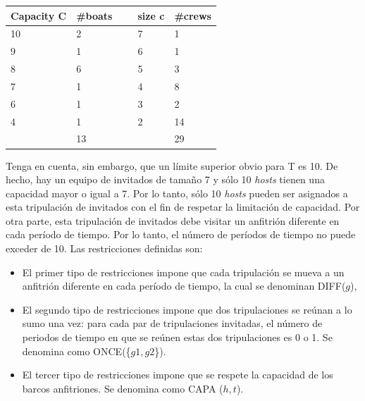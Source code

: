 \documentclass[letter, 10pt]{article}
\begin{document}
\begin{table}[h!]
 \centering
    \begin{tabular}{|l|l|l|l|l|}
    \hline
    Capacity C & \#boats & ~ & size c & \#crews \\ \hline
    10         & 2       & ~ & 7      & 1       \\
    9          & 1       & ~ & 6      & 1       \\
    8          & 6       & ~ & 5      & 3       \\
    7          & 1       & ~ & 4      & 8       \\
    6          & 1       & ~ & 3      & 2       \\
    4          & 1       & ~ & 2      & 14      \\ \hline
    ~          & 13      & ~ & ~      & 29      \\ \hline
    \end{tabular}
\end{table}

Tenga en cuenta, sin embargo, que un límite superior obvio para T es 10. De hecho, hay un equipo de invitados de tamaño 7 y sólo 10 \textit{hosts} tienen una capacidad mayor o igual a 7. Por lo tanto, sólo 10 \textit{hosts} pueden ser asignados a esta tripulación de invitados con el fin de respetar la limitación de capacidad. Por otra parte, esta tripulación de invitados debe visitar un anfitrión diferente en cada período de tiempo. Por lo tanto, el número de períodos de tiempo no puede exceder de 10. Las restricciones definidas son: 

\begin{itemize}
    \item El primer tipo de restricciones impone que cada tripulación se mueva a un anfitrión diferente en cada período de tiempo, la cual se denominan DIFF($g$),
    \item El segundo tipo de restricciones impone que dos tripulaciones se reúnan a lo sumo una vez: para cada par de tripulaciones invitadas, el número de periodos de tiempo en que se reúnen estas dos tripulaciones es 0 o 1. Se denomina como ONCE(\{$g1,g2$\}).
    \item El tercer tipo de restricciones impone que se respete la capacidad de los barcos anfitriones. Se denomina como CAPA ($h,t$). 
\end{itemize}
\end{document}
